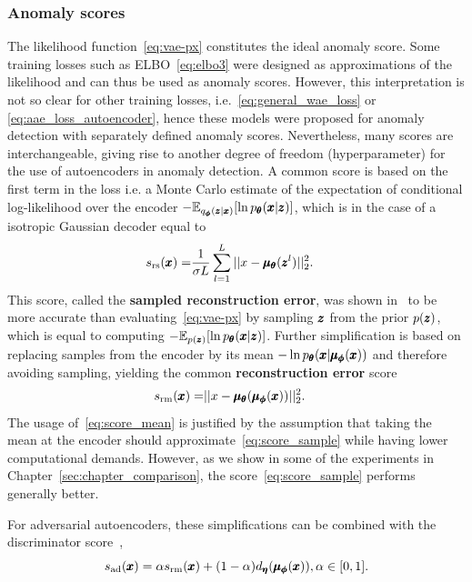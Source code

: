 \subsubsection{Anomaly scores}
The likelihood function~\eqref{eq:vae-px} constitutes the ideal anomaly score. Some training losses such as ELBO~\eqref{eq:elbo3} were designed as approximations of the likelihood and can thus be used as anomaly scores. However, this interpretation is not so clear for other training losses, i.e.~\eqref{eq:general_wae_loss} or \eqref{eq:aae_loss_autoencoder}, hence these models were proposed for anomaly detection with separately defined anomaly scores. Nevertheless, many scores are interchangeable, giving rise to another degree of freedom (hyperparameter) for the use of autoencoders in anomaly detection. A common score is based on the first term in the loss i.e. a Monte Carlo estimate of the expectation of conditional log-likelihood over the encoder $- \mathbb{E}_{q_{\vc{\phi}}(\vc{z}|\vc{x})} \left[ \ln p_{\vc{\theta}}(\vc{x}| \vc{z}) \right]$, which is in the case of a isotropic Gaussian decoder equal to
\begin{align} \label{eq:score_sample}
s_{\text{rs}}(\pmb{{x}}) = & \frac{1}{\sigma L} \sum_{l=1}^L \vert \vert x - \pmb{{\mu}}_{\pmb{{\theta}}} (\pmb{{z}} ^l) \vert \vert_2^2.
\end{align}
This score, called the \textbf{sampled reconstruction error}, was shown in~\cite{xu2018unsupervised} to be more accurate than evaluating~\eqref{eq:vae-px} by sampling $\pmb{{z}}$ from the prior $p(\pmb{{z}})$, which is equal to computing $- \mathbb{E}_{p(\vc{z})} \left[ \ln p_{\vc{\theta}}(\vc{x}| \vc{z}) \right]$. Further simplification is based on replacing samples from the encoder by its mean $- \ln p_{\pmb{{\theta}}}(\pmb{{x}}| \pmb{{\mu}}_{\pmb{{\phi}}}(\pmb{{x}}))$ and therefore avoiding sampling, yielding the common \textbf{reconstruction error} score
\begin{align} \label{eq:score_mean}
s_{\text{rm}}(\pmb{{x}}) = & \vert \vert x - \pmb{{\mu}}_{\pmb{{\theta}}} ( \pmb{{\mu}}_{\pmb{{\phi}}}(\pmb{{x}}) )  \vert \vert_2^2.
\end{align}
The usage of~\eqref{eq:score_mean} is justified by the assumption that taking the mean at the encoder should approximate~\eqref{eq:score_sample} while having lower computational demands. However, as we show in some of the experiments in Chapter~\ref{sec:chapter_comparison}, the score~\eqref{eq:score_sample} performs generally better.

For adversarial autoencoders, these simplifications can be combined with the discriminator score~\cite{schlegl2017unsupervised, zenatiEfficientGANBasedAnomaly2018},
\begin{equation}
    s_{\text{ad}}(\vc{x}) = \alpha s_{\text{rm}}(\vc{x}) + (1-\alpha) d_{\vc{\eta}}(\vc{\mu}_{\vc{\phi}}(\vc{x})), \alpha \in \left[ 0, 1 \right].
\label{eq:aae_score}
\end{equation}

